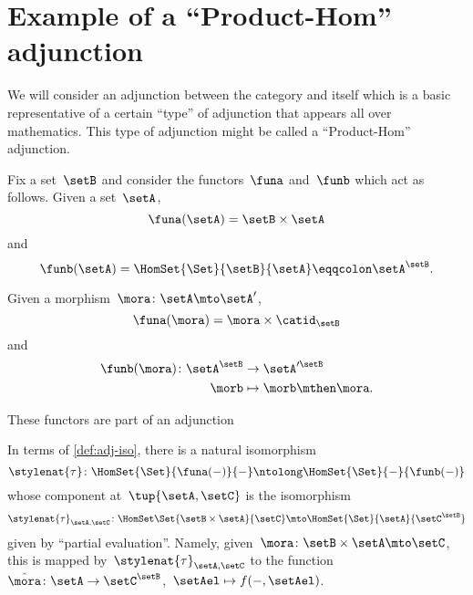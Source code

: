 

\section{Example of a ``Product-Hom'' adjunction}
We will consider an adjunction between the category \Set and itself which is a basic representative of a certain ``type'' of adjunction that appears all over mathematics.
This type of adjunction might be called a ``Product-Hom'' adjunction.

Fix a set~$\setB$ and consider the functors~$\funa$ and~$\funb$ which act as follows.
Given a set~$\setA$,
\begin{equation*}
    \funa(\setA) = \setB \times \setA
\end{equation*}
and
\begin{equation*}
    \funb(\setA) = \HomSet{\Set}{\setB}{\setA} \eqqcolon \setA^\setB.
\end{equation*}

Given a morphism~$\mora\colon \setA \mto \setA'$,
\begin{equation*}
    \funa(\mora) = \mora \times \catid_\setB
\end{equation*}
and
\begin{equation*}
    \begin{aligned}
        \funb(\mora)\colon \setA^\setB &\to \setA'^\setB\\
        \morb &\mapsto \morb \mthen \mora.
    \end{aligned}
\end{equation*}

These functors are part of an adjunction

\begin{center}
\end{center}
In terms of \cref{def:adj-iso}, there is a natural isomorphism
\begin{equation*}
    \stylenat{\tau}\colon \HomSet{\Set}{\funa(- )}{-}  \ntolong   \HomSet{\Set}{-}{\funb( - )}
\end{equation*}
whose component at~$\tup{\setA,\setC}$ is the isomorphism
\begin{equation*}
    \stylenat{\tau}_{\setA,\setC} \colon \HomSet\Set{\setB\times \setA}{\setC} \mto \HomSet{\Set}{\setA}{\setC^\setB}
\end{equation*}
given by ``partial evaluation''.
Namely, given~$\mora \colon \setB \times \setA \mto \setC$, this is mapped by~$\stylenat{\tau}_{\setA,\setC}$ to the function~$\hat \mora \colon \setA \to \setC^\setB$,~$\setAel \mapsto f( -, \setAel)$.

